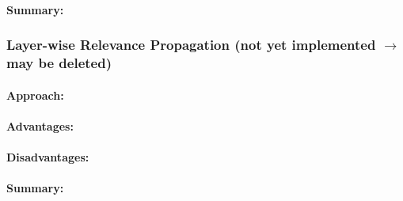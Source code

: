 \paragraph{Summary:}


\subsubsection{Layer-wise Relevance Propagation (not yet implemented $\rightarrow$ may be deleted)}
\paragraph{Approach:}
\paragraph{Advantages:}
\paragraph{Disadvantages:}
\paragraph{Summary:}


